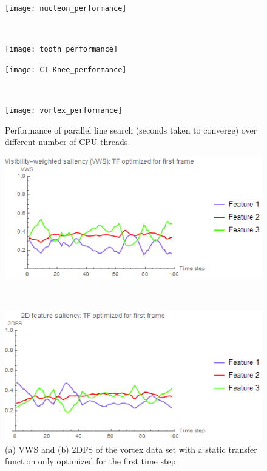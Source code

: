 \begin{figure}
	\centering
	\begin{minipage}{.49\textwidth}
		\texttt{[image: nucleon\_performance]}
	\end{minipage}~
	\begin{minipage}{.49\textwidth}
		\texttt{[image: tooth\_performance]}
	\end{minipage}
	\begin{minipage}{.49\textwidth}
		\texttt{[image: CT-Knee\_performance]}
	\end{minipage}~
	\begin{minipage}{.49\textwidth}
		\texttt{[image: vortex\_performance]}
	\end{minipage}
	\caption[Performance of parallel line search]{Performance of parallel line search (seconds taken to converge) over different number of CPU threads}
	\label{fig:parallelsearch_performance}
\end{figure}

\begin{figure}
	\centering
	\begin{minipage}{.49\textwidth}
		\includegraphics[width=1\linewidth]{images/vorts_static_VWS}
		\subcaption{}
	\end{minipage}~
	\begin{minipage}{.49\textwidth}
		\includegraphics[width=1\linewidth]{images/vorts_static_2DFS}
		\subcaption{}
	\end{minipage}
	\caption{(a) VWS and (b) 2DFS of the vortex data set with a static transfer function only optimized for the first time step}
	\label{fig:vorts_static}
\end{figure}

